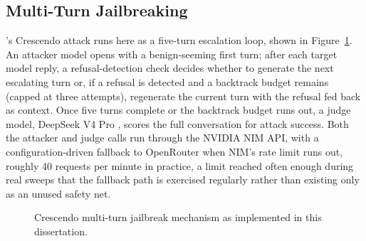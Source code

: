 \subsection{Multi-Turn Jailbreaking}

\citet{russinovich2025great}'s Crescendo attack runs here as a five-turn
escalation loop, shown in Figure~\ref{fig:crescendo-mechanism}. An
attacker model opens with a benign-seeming first turn; after each target
model reply, a refusal-detection check decides whether to generate the
next escalating turn or, if a refusal is detected and a backtrack budget
remains (capped at three attempts), regenerate the current turn with the
refusal fed back as context. Once five turns complete or the backtrack
budget runs out, a judge model, DeepSeek V4 Pro
\citep{deepseekai2026deepseekv4}, scores the full conversation for
attack success. Both the attacker and judge calls run through the NVIDIA
NIM API, with a configuration-driven fallback to OpenRouter
\citep{openrouter2024platform} when NIM's rate limit runs out, roughly
40 requests per minute in practice, a limit reached often enough during
real sweeps that the fallback path is exercised regularly rather than
existing only as an unused safety net.

\begin{figure}[htbp]
\centering
{}
\caption{Crescendo multi-turn jailbreak mechanism as implemented in this dissertation.}
\label{fig:crescendo-mechanism}
\end{figure}

